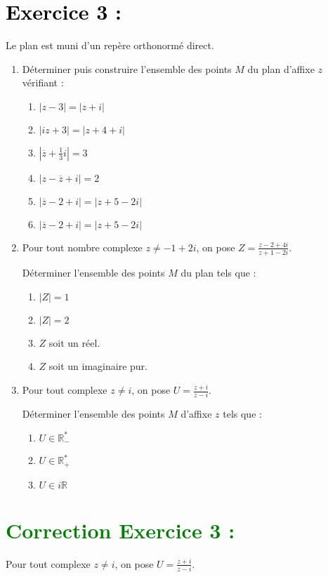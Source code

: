 \documentclass[12pt]{article}
\begin{document}
\section*{\textcolor{black}{Exercice 3 :}}
Le plan est muni d'un rep\`ere orthonorm\'e direct.
\begin{enumerate}
    \item D\'eterminer puis construire l'ensemble des points $M$ du plan d'affixe $z$ v\'erifiant :
    \begin{enumerate}
        \item $|z - 3| = |z + i|$
        \item $|iz + 3| = |z + 4 + i|$
        \item $|\overline{z} + \frac{1}{3}i| = 3$
        \item $|z - \overline{z} + i| = 2$
        \item $|\overline{z} - 2 + i| = |z + 5 - 2i|$
        \item $|\overline{z} - 2 + i| = |z + 5 - 2i|$
    \end{enumerate}
    \item Pour tout nombre complexe $z \neq -1 + 2i$, on pose $Z = \frac{z - 2 + 4i}{z + 1 - 2i}$.

    Déterminer l'ensemble des points $M$ du plan tels que :

\begin{enumerate}
        \item $|Z| = 1$
        \item $|Z| = 2$
        \item $Z$ soit un réel.
        \item $Z$ soit un imaginaire pur.
\end{enumerate}
    \item Pour tout complexe $z \neq i$, on pose
    \(
    U = \frac{z + i}{z - i}.
    \)
    
    Déterminer l’ensemble des points $M$ d’affixe $z$ tels que :
    \begin{enumerate}
        \item $U \in \mathbb{R}^*_{-}$
        \item $U \in \mathbb{R}^*_{+}$
        \item $U \in i\mathbb{R}$
    \end{enumerate}
\end{enumerate}
\section*{\textcolor{green}{Correction Exercice 3 :}}
Pour tout complexe $z \neq i$, on pose
    \(
    U = \frac{z + i}{z - i}.
    \)
    
\end{document}
